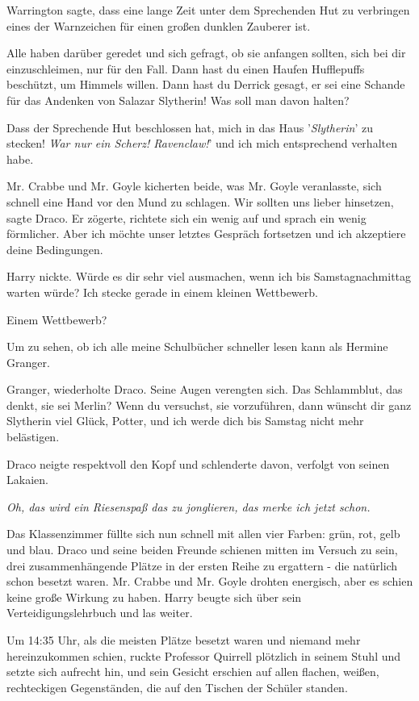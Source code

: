 \glqq Warrington sagte, dass eine lange Zeit unter dem Sprechenden Hut zu
verbringen eines der Warnzeichen für einen großen dunklen Zauberer ist.

Alle haben darüber geredet und sich gefragt, ob sie anfangen sollten, sich bei
dir einzuschleimen, nur für den Fall. Dann hast du einen Haufen Hufflepuffs
beschützt, um Himmels willen. Dann hast du Derrick gesagt, er sei eine Schande
für das Andenken von Salazar Slytherin! Was soll man davon halten?\grqq{}

\glqq Dass der Sprechende Hut beschlossen hat, mich in das Haus
'\emph{Slytherin}' zu stecken! \emph{War nur ein Scherz! Ravenclaw!}' und ich
mich entsprechend verhalten habe.\grqq{}

Mr. Crabbe und Mr. Goyle kicherten beide, was Mr. Goyle veranlasste, sich
schnell eine Hand vor den Mund zu schlagen. \glqq Wir sollten uns lieber
hinsetzen\grqq{}, sagte Draco. Er zögerte, richtete sich ein wenig auf und
sprach ein wenig förmlicher. \glqq Aber ich möchte unser letztes Gespräch
fortsetzen und ich akzeptiere deine Bedingungen.\grqq{}

Harry nickte. \glqq Würde es dir sehr viel ausmachen, wenn ich bis
Samstagnachmittag warten würde? Ich stecke gerade in einem kleinen
Wettbewerb.\grqq{}

\glqq Einem Wettbewerb?\grqq{}

\glqq Um zu sehen, ob ich alle meine Schulbücher schneller lesen kann als
Hermine Granger.\grqq{}

\glqq Granger\grqq{}, wiederholte Draco. Seine Augen verengten sich. \glqq Das
Schlammblut, das denkt, sie sei Merlin? Wenn du versuchst, sie vorzuführen, dann
wünscht dir ganz Slytherin viel Glück, Potter, und ich werde dich bis Samstag
nicht mehr belästigen.\grqq{}

Draco neigte respektvoll den Kopf und schlenderte davon, verfolgt von seinen
Lakaien.

\emph{Oh, das wird ein Riesenspaß das zu jonglieren, das merke ich jetzt
schon.}

Das Klassenzimmer füllte sich nun schnell mit allen vier Farben: grün, rot, gelb
und blau. Draco und seine beiden Freunde schienen mitten im Versuch zu sein,
drei zusammenhängende Plätze in der ersten Reihe zu ergattern - die natürlich
schon besetzt waren. Mr. Crabbe und Mr. Goyle drohten energisch, aber es schien
keine große Wirkung zu haben. Harry beugte sich über sein Verteidigungslehrbuch
und las weiter.

Um 14:35 Uhr, als die meisten Plätze besetzt waren und niemand mehr
hereinzukommen schien, ruckte Professor Quirrell plötzlich in seinem Stuhl und
setzte sich aufrecht hin, und sein Gesicht erschien auf allen flachen, weißen,
rechteckigen Gegenständen, die auf den Tischen der Schüler standen.

